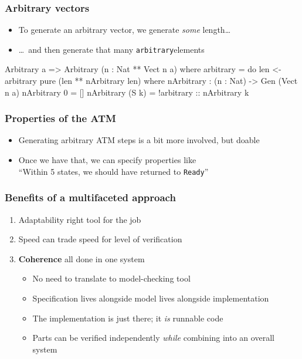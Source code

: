 \documentclass[compress,handout]{beamer}
\begin{document}
\begin{frame}[fragile]
  \frametitle{Arbitrary vectors}

  \begin{itemize}
  \item To generate an arbitrary vector, we generate \textit{some} length\dots
  \item \dots\ and then generate that many \textasciigrave
        \texttt{arbitrary}\textasciigrave elements
  \end{itemize}

  \vspace*{-5mm}

  \begin{idrislisting}
Arbitrary a => Arbitrary (n : Nat ** Vect n a) where
  arbitrary = do
    len <- arbitrary
    pure (len ** nArbitrary len)
  where
    nArbitrary : (n : Nat) -> Gen (Vect n a)
    nArbitrary 0 = []
    nArbitrary (S k) = !arbitrary :: nArbitrary k
  \end{idrislisting}

\end{frame}


\begin{frame}
  \frametitle{Properties of the ATM}

  \begin{itemize}
    \item Generating arbitrary ATM steps is a bit more involved, but doable
    \item Once we have that, we can specify properties like\\
          ``Within 5 states, we should have returned to \texttt{Ready}''
  \end{itemize}


\end{frame}


\begin{frame}
  \frametitle{Benefits of a multifaceted approach}

  \begin{enumerate}
    \item<1-> Adaptability {\textemdash} right tool for the job
    \item<2-> Speed {\textemdash} can trade speed for level of verification
    \item<3-> \textbf{Coherence} {\textemdash} all done in one system
      \begin{itemize}
        \item<4-> No need to translate to model-checking tool
        \item<5-> Specification lives alongside model lives alongside
                  implementation
        \item<6-> The implementation is just there; it \emph{is} runnable code
        \item<7-> Parts can be verified independently \emph{while} combining into an
                  overall system
      \end{itemize}
  \end{enumerate}

\end{frame}
\end{document}
